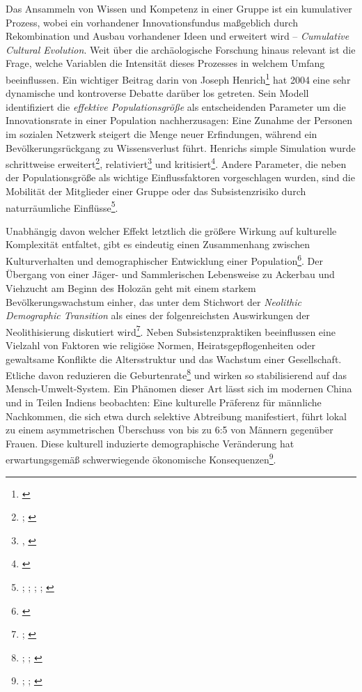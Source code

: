 \documentclass[openany,twoside,twocolumn]{book}
\let\rmarkdownfootnote\footnote%
\def\footnote{\protect\rmarkdownfootnote}
\begin{document}
Das Ansammeln von Wissen und Kompetenz in einer Gruppe ist ein
kumulativer Prozess, wobei ein vorhandener Innovationsfundus maßgeblich
durch Rekombination und Ausbau vorhandener Ideen und erweitert wird --
\emph{Cumulative Cultural Evolution}. Weit über die archäologische
Forschung hinaus relevant ist die Frage, welche Variablen die Intensität
dieses Prozesses in welchem Umfang beeinflussen. Ein wichtiger Beitrag
darin von Joseph Henrich\footnote{\textcite{henrich_demography_2004}}
hat 2004 eine sehr dynamische und kontroverse Debatte darüber los
getreten. Sein Modell identifiziert die \emph{effektive
Populationsgröße} als entscheidenden Parameter um die Innovationsrate in
einer Population nachherzusagen: Eine Zunahme der Personen im sozialen
Netzwerk steigert die Menge neuer Erfindungen, während ein
Bevölkerungsrückgang zu Wissensverlust führt. Henrichs simple Simulation
wurde schrittweise erweitert\footnote{\textcite{KobayashiInnovativenesspopulationsize2012};
  \textcite{henrich_understanding_2016}}, relativiert\footnote{\textcite{collard_population_2013},
  \textcite{BaldiniRevisitingEffectPopulation2015}} und
kritisiert\footnote{\textcite{vaesen_population_2016}}. Andere
Parameter, die neben der Populationsgröße als wichtige Einflussfaktoren
vorgeschlagen wurden, sind die Mobilität der Mitglieder einer Gruppe
oder das Subsistenzrisiko durch naturräumliche Einflüsse\footnote{\textcite{collard_what_2011};
  \textcite{collard_risk_2013}; \textcite{buchanan_drivers_2016};
  \textcite{fitzhugh_risk_2001};
  \textcite{winterhalder_risk-senstive_1999}}.

Unabhängig davon welcher Effekt letztlich die größere Wirkung auf
kulturelle Komplexität entfaltet, gibt es eindeutig einen Zusammenhang
zwischen Kulturverhalten und demographischer Entwicklung einer
Population\footnote{\textcite{shennan_demography_2001}}. Der Übergang
von einer Jäger- und Sammlerischen Lebensweise zu Ackerbau und Viehzucht
am Beginn des Holozän geht mit einem starkem Bevölkerungswachstum
einher, das unter dem Stichwort der \emph{Neolithic Demographic
Transition} als eines der folgenreichsten Auswirkungen der
Neolithisierung diskutiert wird\footnote{\textcite{bocquetappel_paleoanthropological_2002};
  \textcite{gage_what_2009}}. Neben Subsistenzpraktiken beeinflussen
eine Vielzahl von Faktoren wie religiöse Normen, Heiratsgepflogenheiten
oder gewaltsame Konflikte die Altersstruktur und das Wachstum einer
Gesellschaft. Etliche davon reduzieren die Geburtenrate\footnote{\textcite{smith_cultural_1992};
  \textcite{colleran_cultural_2016}; \textcite{richerson_natural_1984}}
und wirken so stabilisierend auf das Mensch-Umwelt-System. Ein Phänomen
dieser Art lässt sich im modernen China und in Teilen Indiens
beobachten: Eine kulturelle Präferenz für männliche Nachkommen, die sich
etwa durch selektive Abtreibung manifestiert, führt lokal zu einem
asymmetrischen Überschuss von bis zu 6:5 von Männern gegenüber Frauen.
Diese kulturell induzierte demographische Veränderung hat
erwartungsgemäß schwerwiegende ökonomische Konsequenzen\footnote{\textcite{banister_shortage_2004};
  \textcite{li_cultural_2000}; \textcite{tuljapurkar_high_1995}}.
\end{document}
